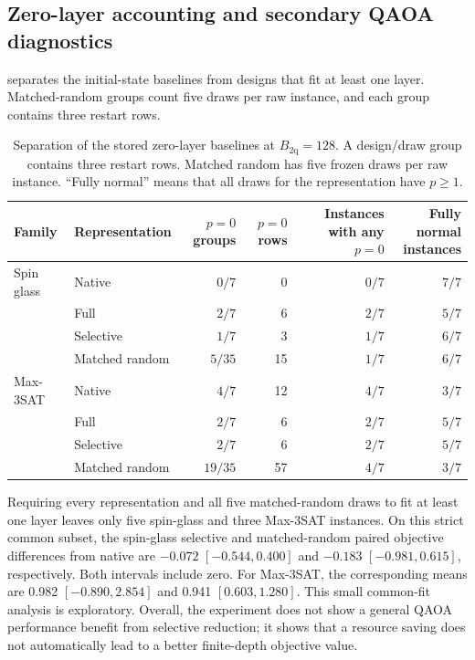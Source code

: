 \documentclass[a4paper,onecolumn,11pt,unpublished]{quantumarticle}
\theoremstyle{remark}
\begin{document}
\FloatBarrier
\subsection{Zero-layer accounting and secondary QAOA diagnostics}
\label{app:results-qaoa}

 separates the initial-state baselines from designs
that fit at least one layer. Matched-random groups count five draws per raw
instance, and each group contains three restart rows.

\begin{table}[!htbp]
    \centering
    \small
    \caption{Separation of the stored zero-layer baselines at
    $B_{\mathrm{2q}}=128$.  A design/draw group contains three restart rows.
    Matched random has five frozen draws per raw instance.  ``Fully normal''
    means that all draws for the representation have $p\geq1$.}
    \label{tab:e3-b128-fit}
    \begin{tabular}{@{}llrrrr@{}}
        \toprule
        Family & Representation
        & $p=0$ groups
        & $p=0$ rows
        & \shortstack{Instances with\\any $p=0$}
        & \shortstack{Fully normal\\instances}\\
        \midrule
        Spin glass & Native         & $0/7$   & 0  & $0/7$ & $7/7$\\
                   & Full           & $2/7$   & 6  & $2/7$ & $5/7$\\
                   & Selective      & $1/7$   & 3  & $1/7$ & $6/7$\\
                   & Matched random & $5/35$ & 15 & $1/7$ & $6/7$\\
        \addlinespace
        Max-3SAT  & Native         & $4/7$   & 12 & $4/7$ & $3/7$\\
                   & Full           & $2/7$   & 6  & $2/7$ & $5/7$\\
                   & Selective      & $2/7$   & 6  & $2/7$ & $5/7$\\
                   & Matched random & $19/35$ & 57 & $4/7$ & $3/7$\\
        \bottomrule
    \end{tabular}
\end{table}
Requiring every representation and all five matched-random draws to fit at
least one layer leaves only five spin-glass and three Max-3SAT instances.  On
this strict common subset, the spin-glass selective and matched-random paired
objective differences from native are $-0.072$ $[-0.544,0.400]$ and $-0.183$
$[-0.981,0.615]$, respectively.  Both intervals include zero.  For Max-3SAT,
the corresponding means are 0.982 $[-0.890,2.854]$ and 0.941
$[0.603,1.280]$.  This small common-fit analysis is exploratory.  Overall, the
experiment does not show a general QAOA performance benefit from selective
reduction; it shows that a resource saving does not automatically lead to a
better finite-depth objective value.
\end{document}
